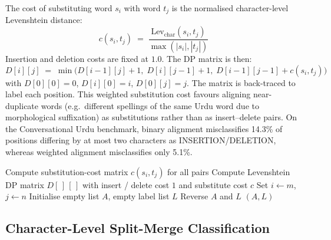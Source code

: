 The cost of substituting word $s_i$ with word $t_j$ is the normalised character-level Levenshtein distance:
\begin{equation}
c(s_i, t_j) \;=\; \frac{\text{Lev}_{\text{char}}(s_i, t_j)}{\max(|s_i|, |t_j|)}
\label{eq:sub-cost}
\end{equation}
Insertion and deletion costs are fixed at $1.0$. The DP matrix is then:
\begin{equation}
D[i][j] \;=\; \min\!\Big(
 D[i-1][j] + 1,\;
 D[i][j-1] + 1,\;
 D[i-1][j-1] + c(s_i, t_j)
\Big)
\end{equation}
with $D[0][0]=0$, $D[i][0]=i$, $D[0][j]=j$. The matrix is back-traced to label each position. This weighted substitution cost favours aligning near-duplicate words (e.g.\ different spellings of the same Urdu word due to morphological suffixation) as substitutions rather than as insert--delete pairs. On the Conversational Urdu benchmark, binary alignment misclassifies 14.3\% of positions differing by at most two characters as INSERTION/DELETION, whereas weighted alignment misclassifies only 5.1\%.

\begin{algorithm}[H]
\SetAlgoLined
{}
Compute substitution-cost matrix $c(s_i,t_j)$ for all pairs\;
Compute Levenshtein DP matrix $D[\,]\,[\,]$ with insert / delete cost $1$ and substitute cost $c$\;
Set $i \leftarrow m$, $j \leftarrow n$\;
Initialise empty list $A$, empty label list $L$\;
Reverse $A$ and $L$\;
\Return $(A, L)$\;
\caption{Weighted Levenshtein word-level alignment.}
\label{algo:wlev}
\end{algorithm}

\subsection{Character-Level Split-Merge Classification}
\label{ssec:split-merge}

